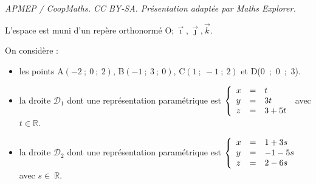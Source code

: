 \documentclass[10pt]{article}
\providecommand{\R}{\mathbb{R}}
\providecommand{\Oijk}{\(\mathrm{O};\vec{\imath},\vec{\jmath},\vec{k}\)}
\begin{document}
\noindent\textit{APMEP / CoopMaths. CC BY-SA. Présentation adaptée par Maths Explorer.}\par\medskip
\medskip

L'espace est muni d'un repère orthonormé \Oijk.

On considère :

\begin{itemize}[label=$\bullet~$]
\item les points A$(-2~;~0~;~2)$,\: B$(-1~;~3~;~0)$,\: C$(1~;~-1~;~2)$ et D(0~;~0~;~3).
\item la droite $\mathcal{D}_1$ dont une représentation paramétrique est $\left\{\begin{array}{l c l}
x&=&t\\
y &=& 3t\\
z &=& 3 + 5t
\end{array}\right.$ avec $t \in \R$.
\item la droite $\mathcal{D}_2$ dont une représentation paramétrique est $\left\{\begin{array}{l c l}
x&=&1 + 3s\\ y &=& -1 - 5s\\z &=& 2 - 6s
\end{array}\right.$ avec $s \in~\R$.
\end{itemize}

\medskip
\end{document}
